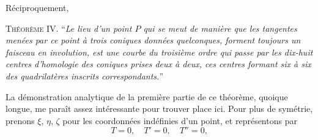 \documentclass[12pt,a4paper]{article}
\begin{document}
R\'eciproquement,

\medskip
\textsc{Th\'eor\`eme IV.} ``\textit{Le lieu d'un point $P$ qui se meut de mani\`ere que les tangentes men\'ees par ce point \`a trois coniques donn\'ees quelconques, forment toujours un faisceau en involution, est une courbe du troisi\`eme ordre qui passe par les dix-huit centres d'homologie des coniques prises deux \`a deux, ces centres formant six \`a six des quadrilat\`eres inscrits correspondants.}''

La d\'emonstration analytique de la premi\`ere partie de ce th\'eor\`eme, quoique longue, me para\^it assez int\'eressante pour trouver place ici. Pour plus de sym\'etrie, prenons $\xi$, $\eta$, $\zeta$ pour les coordonn\'ees ind\'efinies d'un point, et repr\'esentons par
\[
T = 0,\quad T' = 0,\quad T'' = 0,
\]

\newpage
\setcounter{page}{192}
\end{document}
